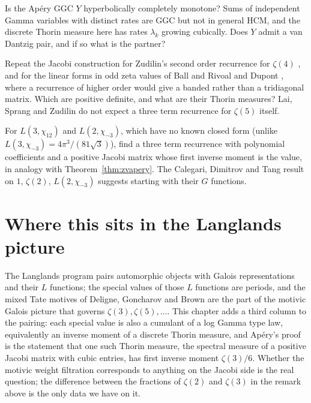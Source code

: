 \begin{problem}\label{op:zvhcm}
Is the Ap\'ery GGC $Y$ hyperbolically completely monotone? Sums of independent Gamma variables with distinct rates are GGC but not in general HCM, and the discrete Thorin measure here has rates $\lambda_k$ growing cubically. Does $Y$ admit a van Dantzig pair, and if so what is the partner?
\end{problem}

\begin{problem}\label{op:zvbanded}
Repeat the Jacobi construction for Zudilin's second order recurrence for $\zeta(4)$ \cite{zudilin2003}, and for the linear forms in odd zeta values of Ball and Rivoal \cite{ballrivoal2001} and Dupont \cite{dupont2018}, where a recurrence of higher order would give a banded rather than a tridiagonal matrix. Which are positive definite, and what are their Thorin measures? Lai, Sprang and Zudilin \cite{laisprangzudilin2025} do not expect a three term recurrence for $\zeta(5)$ itself.
\end{problem}

\begin{problem}\label{op:zvfractions}
For $L(3,\chi_{12})$ and $L(2,\chi_{-3})$, which have no known closed form (unlike $L(3,\chi_{-3})=4\pi^3/(81\sqrt3)$), find a three term recurrence with polynomial coefficients and a positive Jacobi matrix whose first inverse moment is the value, in analogy with Theorem~\ref{thm:zvapery}. The Calegari, Dimitrov and Tang result on $1$, $\zeta(2)$, $L(2,\chi_{-3})$ suggests starting with their $G$ functions.
\end{problem}

\section{Where this sits in the Langlands picture}

The Langlands program pairs automorphic objects with Galois representations and their $L$ functions; the special values of those $L$ functions are periods, and the mixed Tate motives of Deligne, Goncharov and Brown are the part of the motivic Galois picture that governs $\zeta(3),\zeta(5),\dots$. This chapter adds a third column to the pairing: each special value is also a cumulant of a log Gamma type law, equivalently an inverse moment of a discrete Thorin measure, and Ap\'ery's proof is the statement that one such Thorin measure, the spectral measure of a positive Jacobi matrix with cubic entries, has first inverse moment $\zeta(3)/6$. Whether the motivic weight filtration corresponds to anything on the Jacobi side is the real question; the difference between the fractions of $\zeta(2)$ and $\zeta(3)$ in the remark above is the only data we have on it.
